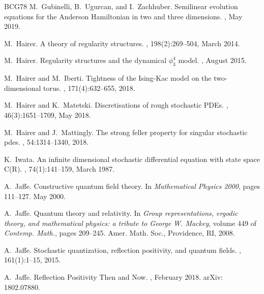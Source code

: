 \documentclass[a4paper,11pt]{article}
\numberwithin{equation}{section}
\begin{document}
\begin{thebibliography}{BCG{\etalchar{+}}78}
M.~Gubinelli, B.~Ugurcan, and I.~Zachhuber.
\newblock Semilinear evolution equations for the {Anderson} {Hamiltonian} in
  two and three dimensions.
, May 2019.

M.~Hairer.
\newblock A theory of regularity structures.
, 198(2):269--504, March 2014.

M.~Hairer.
\newblock Regularity structures and the dynamical $\phi^4_3$ model.
, August 2015.

M.~Hairer and M.~Iberti.
\newblock Tightness of the {Ising}-{Kac} model on the two-dimensional torus.
, 171(4):632--655, 2018.

M.~Hairer and K.~Matetski.
\newblock Discretisations of rough stochastic {PDEs}.
, 46(3):1651--1709, May 2018.

M.~Hairer and J.~Mattingly.
\newblock The strong feller property for singular stochastic pdes.
, 54:1314--1340, 2018.

K.~Iwata.
\newblock An infinite dimensional stochastic differential equation with state
  space {C}({R}).
, 74(1):141--159, March
  1987.

A.~Jaffe.
\newblock Constructive quantum field theory.
\newblock In {\em Mathematical {Physics} 2000}, pages 111--127. May 2000.

A.~Jaffe.
\newblock Quantum theory and relativity.
\newblock In {\em Group representations, ergodic theory, and mathematical
  physics: a tribute to {G}eorge {W}. {M}ackey}, volume 449 of {\em Contemp.
  Math.}, pages 209--245. Amer. Math. Soc., Providence, RI, 2008.

A.~Jaffe.
\newblock Stochastic quantization, reflection positivity, and quantum fields.
, 161(1):1--15, 2015.

A.~Jaffe.
\newblock Reflection {Positivity} {Then} and {Now}.
, February 2018.
\newblock arXiv: 1802.07880.


\end{thebibliography}
\end{document}
